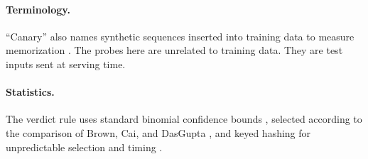 \paragraph{Terminology.} ``Canary'' also names synthetic sequences inserted into
training data to measure memorization \cite{carlini2019secret}. The probes here
are unrelated to training data. They are test inputs sent at serving time.

\paragraph{Statistics.} The verdict rule uses standard binomial confidence
bounds \cite{wilson1927,clopper1934}, selected according to the comparison of
Brown, Cai, and DasGupta \cite{brown2001}, and keyed hashing for unpredictable
selection and timing \cite{rfc2104}.
